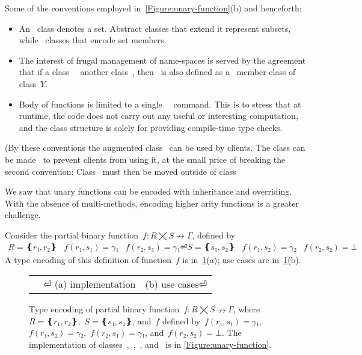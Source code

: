 Some of the conventions employed in~\cref{Figure:unary-function}(b) and henceforth:
\begin{itemize}
  \item An~ class denotes a set. Abstract classes that extend it represent
      subsets, while~ classes that encode set members.
  \item The interest of frugal management of name-spaces is served by the agreement that if
    a class~~ another class~, then~ is also defined
    as a~ member class of class~$Y$.
  \item Body of functions is limited to a single~~\cc{;} command.
      This is to stress that at runtime, the code does not carry out any useful or interesting computation,
      and the class structure is solely for providing compile-time type checks.
\end{itemize}
(By these conventions the augmented class~ can be used by clients.
The class can be made~ to prevent clients from using it,
  at the small price of breaking the second convention:
  Class~ must then be moved outside of class~

We saw that unary functions can be encoded with inheritance and overriding.
With the absence of multi-methods, encoding higher arity functions is a greater challenge.

Consider the partial binary function~$f: R⨉S↛Γ$, defined by
\begin{equation}
  \label{Equation:simple-binary}
  \begin{array}{ccc}
    R=❴r₁,r₂❵ & f(r₁,s₁)=γ₁ & f(r₂,s₁)=γ₁⏎
    S=❴s₁,s₂❵ & f(r₁,s₂)=γ₂ & f(r₂, s₂)=⊥
  \end{array}
\end{equation}
A \Java type encoding of this definition of function~$f$
  is in~\cref{Figure:simple-binary}(a); use cases
    are in~\cref{Figure:simple-binary}(b).

\begin{figure}[hbt]
  \caption{\label{Figure:simple-binary}%
  Type encoding of partial binary function~$f: R⨉S↛Γ$,
  where~$R=❴r₁,r₂❵$,~$S=❴s₁,s₂❵$, and~$f$
  defined by~$f(r₁,s₁)=γ₁$,~$f(r₁,s₂)=γ₂$,~$f(r₂,s₁)=γ₁$, and~$f(r₂, s₂)=⊥$.
  The implementation of classes~,~,~, and~ is in \cref{Figure:unary-function}.}
  \begin{tabular}{cc}
   \hspace{-2.5ex}
   \parbox[c]{0.57\linewidth}{}
   &
   \hspace{-16ex}
   \parbox[c]{53ex}{}
⏎
   \hspace{-7ex}(a) implementation & \hspace{-5ex}(b) use cases⏎
  \end{tabular}
\end{figure}

